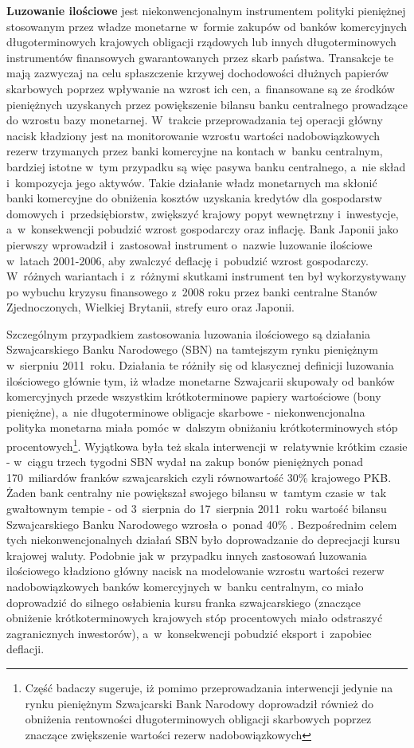 \textbf{Luzowanie ilościowe} jest niekonwencjonalnym instrumentem polityki pieniężnej stosowanym przez władze monetarne w~formie zakupów od banków komercyjnych długoterminowych krajowych obligacji rządowych lub innych długoterminowych instrumentów finansowych gwarantowanych przez skarb państwa. Transakcje te mają zazwyczaj na celu spłaszczenie krzywej dochodowości dłużnych papierów skarbowych poprzez wpływanie na wzrost ich cen, a~finansowane są ze środków pieniężnych uzyskanych przez powiększenie bilansu banku centralnego prowadzące do wzrostu bazy monetarnej. W~trakcie przeprowadzania tej operacji główny nacisk kładziony jest na monitorowanie wzrostu wartości nadobowiązkowych rezerw trzymanych przez banki komercyjne na kontach w~banku centralnym, bardziej istotne w~tym przypadku są więc pasywa banku centralnego, a~nie skład i~kompozycja jego aktywów. Takie działanie władz monetarnych ma skłonić banki komercyjne do obniżenia kosztów uzyskania kredytów dla gospodarstw domowych i~przedsiębiorstw, zwiększyć krajowy popyt wewnętrzny i~inwestycje, a~w~konsekwencji pobudzić wzrost gospodarczy oraz inflację. Bank Japonii jako pierwszy wprowadził i~zastosował instrument o~nazwie luzowanie ilościowe w~latach 2001-2006, aby zwalczyć deflację i~pobudzić wzrost gospodarczy. W~różnych wariantach i~z~różnymi skutkami instrument ten był wykorzystywany po wybuchu kryzysu finansowego z~2008 roku przez banki centralne Stanów Zjednoczonych, Wielkiej Brytanii, strefy euro oraz Japonii.

Szczególnym przypadkiem zastosowania luzowania ilościowego są działania Szwajcarskiego Banku Narodowego (SBN) na tamtejszym rynku pieniężnym w~sierpniu 2011~roku. Działania te różniły się od klasycznej definicji luzowania ilościowego głównie tym, iż władze monetarne Szwajcarii skupowały od banków komercyjnych przede wszystkim krótkoterminowe papiery wartościowe (bony pieniężne), a~nie długoterminowe obligacje skarbowe - niekonwencjonalna polityka monetarna miała pomóc w~dalszym obniżaniu krótkoterminowych stóp procentowych\footnote{Część badaczy sugeruje, iż pomimo przeprowadzania interwencji jedynie na rynku pieniężnym Szwajcarski Bank Narodowy doprowadził również do obniżenia rentowności długoterminowych obligacji skarbowych poprzez znaczące zwiększenie wartości rezerw nadobowiązkowych\cite{christensen21}}. Wyjątkowa była też skala interwencji w~relatywnie krótkim czasie - w~ciągu trzech tygodni \acs{SBN} wydał na zakup bonów pieniężnych ponad 170~miliardów franków szwajcarskich czyli równowartość 30\% krajowego \acs{PKB}. Żaden bank centralny nie powiększał swojego bilansu w~tamtym czasie w~tak gwałtownym tempie - od 3~sierpnia do 17~sierpnia 2011~roku wartość bilansu Szwajcarskiego Banku Narodowego wzrosła o~ponad 40\% \cite{christensen21}. Bezpośrednim celem tych niekonwencjonalnych działań \acs{SBN} było doprowadzanie do deprecjacji kursu krajowej waluty. Podobnie jak w~przypadku innych zastosowań luzowania ilościowego kładziono główny nacisk na modelowanie wzrostu wartości rezerw nadobowiązkowych banków komercyjnych w~banku centralnym, co miało doprowadzić do silnego osłabienia kursu franka szwajcarskiego (znaczące obniżenie krótkoterminowych krajowych stóp procentowych miało odstraszyć zagranicznych inwestorów), a~w~konsekwencji pobudzić eksport i~zapobiec deflacji.

